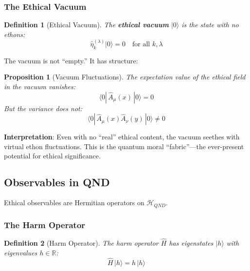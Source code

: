 \documentclass[12pt]{article}
\newtheorem{definition}{Definition}[section]
\newtheorem{proposition}{Proposition}[section]
\begin{document}
\subsubsection{The Ethical Vacuum}

\begin{definition}[Ethical Vacuum]
The \textbf{ethical vacuum} $|0\rangle$ is the state with no ethons:
\begin{equation}
    \hat{\eta}_k^{(\lambda)} |0\rangle = 0 \quad \text{for all } k, \lambda
\end{equation}
\end{definition}

The vacuum is not ``empty.'' It has structure:

\begin{proposition}[Vacuum Fluctuations]
\emph{The expectation value of the ethical field in the vacuum vanishes:}
\begin{equation}
    \langle 0| \,\hat{A}_\mu(x)\, |0\rangle = 0
\end{equation}
\emph{But the variance does not:}
\begin{equation}
    \langle 0| \,\hat{A}_\mu(x) \hat{A}_\nu(y)\, |0\rangle \neq 0
\end{equation}
\end{proposition}

\textbf{Interpretation}: Even with no ``real'' ethical content, the vacuum seethes with virtual ethon fluctuations. This is the quantum moral ``fabric''---the ever-present potential for ethical significance.

\subsection{Observables in QND}

Ethical observables are Hermitian operators on $\mathcal{H}_{QND}$.

\subsubsection{The Harm Operator}

\begin{definition}[Harm Operator]
The harm operator $\hat{H}$ has eigenstates $|h\rangle$ with eigenvalues $h \in \mathbb{R}$:
\begin{equation}
    \hat{H} \,|h\rangle = h \,|h\rangle
\end{equation}
\end{definition}
\end{document}
